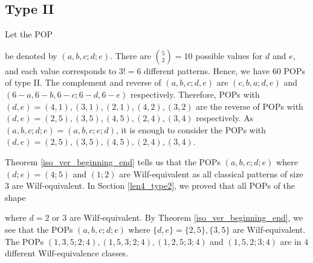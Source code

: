 \documentclass[12pt, english, a4paper]{article}
\theoremstyle{plain}
\theoremstyle{definition}
\theoremstyle{remark}
\begin{document}
\subsection{Type II}
Let the POP  be denoted by $(a,b,c; d;e)$.
There are $\binom{5}{2}=10$ possible values for $d$ and $e$, and each value corresponds to $3!=6$ different patterns. Hence, we have $60$ POPs of type II.  The complement and reverse of $(a,b,c;d,e)$ are $(c,b,a;d,e)$ and $(6-a,6-b,6-c;6-d,6-e)$ respectively. Therefore, POPs with $(d,e)=(4,1),(3,1),(2,1),(4,2),(3,2)$ are the reverse of POPs with $(d,e)=(2,5),(3,5),(4,5),(2,4),(3,4)$ respectively. As $(a,b,c;d;e)=(a,b,c;e;d)$, it is enough to consider the POPs with $(d,e)=(2,5),(3,5),(4,5),(2,4),(3,4)$.
      
      Theorem \ref{iso_ver_beginning_end} tells us that the POPs  $(a,b,c;d;e)$  where  $(d;e)=(4;5)$ and $(1;2)$ are Wilf-equivalent as all classical patterns of size $3$ are Wilf-equivalent. In Section \ref{len4_type2}, we proved that all POPs of the shape  where $d=2$ or $3$ are Wilf-equivalent. By Theorem \ref{iso_ver_beginning_end}, we see that the POPs $(a,b,c;d;e)$ where $\{d,e\}=\{2,5\},\{3,5\}$ are Wilf-equivalent. 
 The POPs $(1,3,5;2;4), (1,5,3;2;4), (1,2,5;3;4)$ and $(1,5,2;3;4)$  are in $4$ different Wilf-equivalence classes. 
\end{document}
